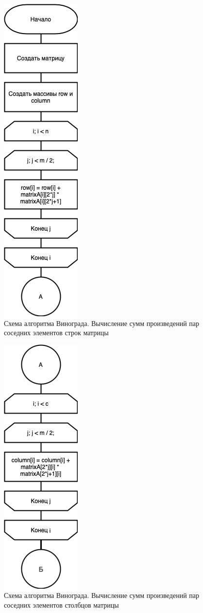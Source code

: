 \begin{figure}[h]
    \centering
    \includegraphics[width=0.22\linewidth]{img/WinogradPrA.png}
    \caption{Схема алгоритма Винограда. Вычисление сумм произведений 
    пар соседних элементов строк матрицы}
    \label{fig:mpr8}
\end{figure}

\begin{figure}[h]
    \centering
    \includegraphics[width=0.22\linewidth]{img/WinogradPrB.png}
    \caption{Схема алгоритма Винограда. Вычисление сумм произведений 
    пар соседних элементов столбцов матрицы}
    \label{fig:mpr7}
\end{figure}

